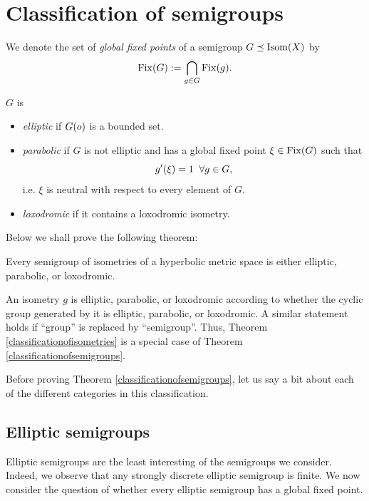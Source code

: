 \bigskip
\section{Classification of semigroups}

\begin{notation}
\label{notationglobalfixedpoints}
We denote the set of \emph{global fixed points} of a semigroup $G\preceq\operatorname{Isom}(X)$ by
\[
\operatorname{Fix}(G) := \bigcap_{g\in G}\operatorname{Fix}(g).
\]
\end{notation}

\begin{definition}
\label{definitionclassification2}
$G$ is
\begin{itemize}
\item \emph{elliptic} if $G(o)$ is a bounded set.
\item \emph{parabolic} if $G$ is not elliptic and has a global fixed point $\xi\in \operatorname{Fix}(G)$ such that 
\[
g'(\xi) = 1 \;\;\forall g\in G,
\]
i.e. $\xi$ is neutral with respect to every element of $G$.
\item \emph{loxodromic} if it contains a loxodromic isometry.
\end{itemize}
\end{definition}

Below we shall prove the following theorem:

\begin{theorem}
\label{classificationofsemigroups}
Every semigroup of isometries of a hyperbolic metric space is either elliptic, parabolic, or loxodromic.
\end{theorem}

\begin{observation}
An isometry $g$ is elliptic, parabolic, or loxodromic according to whether the cyclic group generated by it is elliptic, parabolic, or loxodromic. A similar statement holds if ``group'' is replaced by ``semigroup''. Thus, Theorem \ref{classificationofisometries} is a special case of Theorem \ref{classificationofsemigroups}.
\end{observation}

Before proving Theorem \ref{classificationofsemigroups}, let us say a bit about each of the different categories in this classification.

\subsection{Elliptic semigroups}
Elliptic semigroups are the least interesting of the semigroups we consider. Indeed, we observe that any strongly discrete elliptic semigroup is finite. We now consider the question of whether every elliptic semigroup has a global fixed point.

